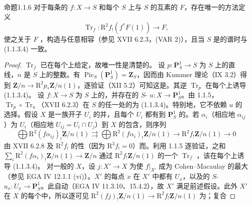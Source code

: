 \begin{SGAresult}{命题}{1.1.6}
对于每条的 $f:X\to S$ 和每个 $S$ 上与 $S$ 的互素的 $F$，存在唯一的方法定义
\[\operatorname{Tr}_f:\mathrm R^2f_!(f^*F(1))\longrightarrow F,\]
使之关于 $F$ ，构造与任意相容（参见 XVII 6.2.3，(VAR 2)），且当 $S$ 是的谱时与 (1.1.3.4) 一致。
\end{SGAresult}
\begin{proof}
 $\operatorname{Tr}_f$ 已在每个上给定，故唯一性是清楚的。
设 $p:\mathbf P^1_S\to S$ 为 $S$ 上的直线，$n$ 是 $S$ 上的整数。有 $\operatorname{Pic}_S(\mathbf P^1_S)=\mathbf Z_S$，因而由 Kummer 理论（IX 3.2）得到 $\mathbf Z/n\to\mathrm R^2p_*\mathbf Z/n(1)$，逐验证（XII 5.2）可知这是。其逆 $\operatorname{Tr}_p$ 在每个上诱导 (1.1.3.4)。
设 $f:X\to S$ 为 $S$ 上的，并存在的 $S$- $u:X\to\mathbf P^1_S$。由 1.1.5， $\operatorname{Tr}_p\circ\operatorname{Tr}_u$（XVII 6.2.3）在 $S$ 的任一处的为 (1.1.3.4)。特别地，它不依赖 $u$ 的选择。假设 $X$ 是一族开子 $U_i$ 的并，且每个 $U_i$ 都有到 $\mathbf P^1_S$ 的。若 $\alpha_i$（相应地 $\alpha_{ij}$）为 $U_i$（相应地 $U_{ij}=U_i\cap U_j$）到 $X$ 的包含，则序列
\[\bigoplus\mathrm R^2(f\alpha_{ij})_!\mathbf Z/n(1)\rightrightarrows\bigoplus\mathrm R^2(f\alpha_i)_!\mathbf Z/n(1)\longrightarrow\mathrm R^2f_!\mathbf Z/n(1)\longrightarrow0\]
由 XVII 6.2.8 及 $\mathrm R^2f_!$ 的性（因为 $\mathrm R^3f_!=0$）而。利用 1.1.5 逐验证，之和 $\sum_i\mathrm R^2(f\alpha_i)_!\mathbf Z/n(1)\to\mathbf Z/n$ 通过 $\mathrm R^2f_!\mathbf Z/n(1)$ 的一个 $\operatorname{Tr}_f$ ，该在每个上诱导 (1.1.3.4)。
对一般的 $X$，设 $j:X'\to X$ 为使 $f|_{X'}$ 成为 Cohen--Macaulay 的最大（参见 EGA IV 12.1.1 (vi)）。$X'$ 的每点 $x$ 在 $X'$ 中都有 $U_x$，以及的 $S$- $u_x:U_x\to\mathbf P^1_S$。此自动（EGA IV 11.3.10、15.4.2），故 $X'$ 满足前述假设。此外 $X'$ 在 $X$ 的每个中，所以逐可见 $\mathrm R^2(fj)_!\mathbf Z/n(1)\to\mathrm R^2f_!\mathbf Z/n(1)$ 为；复合

\end{proof}
